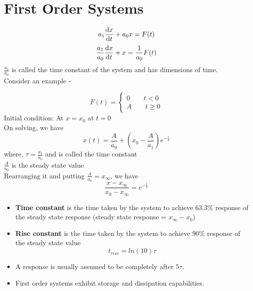 \documentclass{article}
\begin{document}
\section{First Order Systems}
	\[a_1 \dv{x}{t} + a_0 x = F(t)\]
	\[\frac{a_1}{a_0} \dv{x}{t} + x = \frac{1}{a_0} F(t) \]
	$\frac{a_1}{a_0}$ is called the time constant of the system and has dimensions of time.\\

	Consider an example - 

	\[F(t) = 
	\begin{cases}
	0 \qquad t<0\\
	A \qquad t\geq0
	\end{cases}
	\]
	Initial condition: At $x=x_0$ at $t=0$\\
	On solving, we have 
	\[x(t) = \frac{A}{a_0} + \left(x_0 - \frac{A}{a_1} \right) e^{- \frac{t}{\tau}}\]
	where, $\tau = \frac{a_1}{a_0}$ and is called the time constant\\
	$\frac{A}{a_0}$ is the steady state value\\
	Rearranging it and putting $\frac{A}{a_0} = x_\infty$, we have
	\[\frac{x-x_\infty}{x_0-x_\infty} = e^{- \frac{t}{\tau}}\]

	\begin{itemize}
		\item \textbf{Time constant} is the time taken by the system to achieve 63.3\% response  of the steady state response (steady state response = $x_\infty - x_0$)
		\item \textbf{Rise constant} is the time taken by the system to achieve 90\% response of the steady state value
		\[t_{rise} = ln(10) \tau\]

		\item A response is usually assumed to be completely after $5\tau$.
		\item First order systems exhibit storage and dissipation capabilities.

	\end{itemize}
\end{document}
